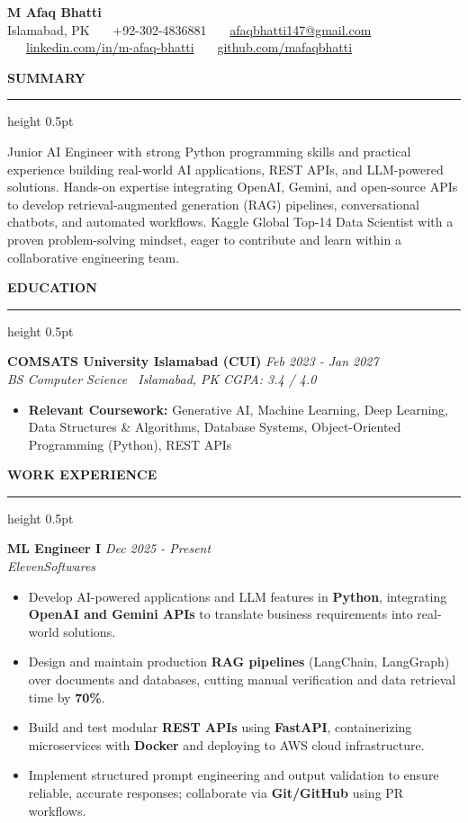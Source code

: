 \documentclass[10pt,letterpaper]{article}
\newcommand{\resumesection}[1]{%
  \vspace{4pt}%
  {\fontsize{10.5pt}{12pt}\selectfont\textbf{\MakeUppercase{#1}}}%
  \vspace{1.5pt}%
  \hrule height 0.5pt%
  \vspace{3pt}%
}
\begin{document}
\begin{center}
  {\fontsize{18pt}{20pt}\selectfont\textbf{M Afaq Bhatti}}\\[3pt]
  {\fontsize{9pt}{11pt}\selectfont Islamabad, PK \ \textbar\ \ +92-302-4836881 \ \textbar\ \ \href{mailto:afaqbhatti147@gmail.com}{afaqbhatti147@gmail.com} \ \textbar\ \ \href{https://www.linkedin.com/in/m-afaq-bhatti/}{linkedin.com/in/m-afaq-bhatti} \ \textbar\ \ \href{https://github.com/mafaqbhatti}{github.com/mafaqbhatti}}
\end{center}
\vspace{-6pt}

\resumesection{Summary}
Junior AI Engineer with strong Python programming skills and practical experience building real-world AI applications, REST APIs, and LLM-powered solutions. Hands-on expertise integrating OpenAI, Gemini, and open-source APIs to develop retrieval-augmented generation (RAG) pipelines, conversational chatbots, and automated workflows. Kaggle Global Top-14 Data Scientist with a proven problem-solving mindset, eager to contribute and learn within a collaborative engineering team.

\resumesection{Education}
\noindent\textbf{COMSATS University Islamabad (CUI)} \hfill \textit{Feb 2023 - Jan 2027} \\
\textit{BS Computer Science \textbar\ Islamabad, PK} \hfill \textit{CGPA: 3.4 / 4.0}
\begin{itemize}
  \item \textbf{Relevant Coursework:} Generative AI, Machine Learning, Deep Learning, Data Structures \& Algorithms, Database Systems, Object-Oriented Programming (Python), REST APIs
\end{itemize}

\resumesection{Work Experience}
\noindent\textbf{ML Engineer I} \hfill \textit{Dec 2025 - Present} \\
\textit{ElevenSoftwares}
\begin{itemize}
  \item Develop AI-powered applications and LLM features in \textbf{Python}, integrating \textbf{OpenAI and Gemini APIs} to translate business requirements into real-world solutions.
  \item Design and maintain production \textbf{RAG pipelines} (LangChain, LangGraph) over documents and databases, cutting manual verification and data retrieval time by \textbf{70\%}.
  \item Build and test modular \textbf{REST APIs} using \textbf{FastAPI}, containerizing microservices with \textbf{Docker} and deploying to AWS cloud infrastructure.
  \item Implement structured prompt engineering and output validation to ensure reliable, accurate responses; collaborate via \textbf{Git/GitHub} using PR workflows.
\end{itemize}
\end{document}
